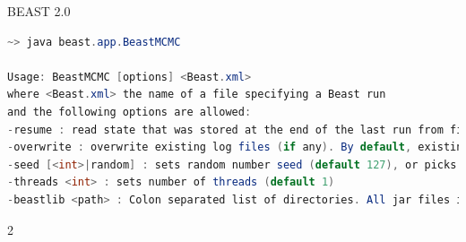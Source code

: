 \documentclass{beamer}
\def\part{2}
\theoremstyle{definition}
\begin{document}
\begin{frame}[containsverbatim]
{BEAST 2.0}

\begin{lstlisting}[language=java]
~> java beast.app.BeastMCMC

Usage: BeastMCMC [options] <Beast.xml>
where <Beast.xml> the name of a file specifying a Beast run
and the following options are allowed:
-resume : read state that was stored at the end of the last run from file  and append log file
-overwrite : overwrite existing log files (if any). By default, existing files will not be overwritten.
-seed [<int>|random] : sets random number seed (default 127), or picks a random seed
-threads <int> : sets number of threads (default 1)
-beastlib <path> : Colon separated list of directories. All jar files in the path are loaded. (default 'beastlib')
\end{lstlisting}
\end{frame}

\fi

\if \part 2


%
%
%
\fi
\end{document}
